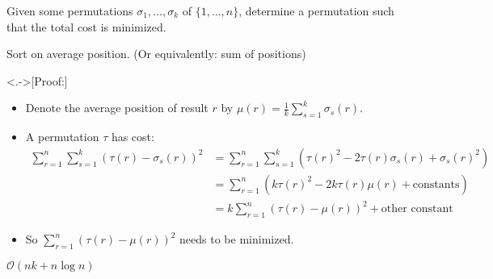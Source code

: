 \begin{frame}
    \frametitle{\problemtitle}
    \begin{description}
        \item<+->[Problem:] Given some permutations $\sigma_1, \ldots, \sigma_k$ of $\{1, \ldots, n\}$, determine a permutation such that the total cost is minimized.
        \item<+->[Solution:] Sort on average position. (Or equivalently: sum of positions)
        \item<.->[Proof:]
            \begin{itemize}
            \item<+-> Denote the average position of result $r$ by $\mu(r) = \frac{1}{k} \sum_{s=1}^k \sigma_s(r)$.
            \item<+-> A permutation $\tau$ has cost:
                \begin{align*}
                \sum_{r=1}^n \sum_{s=1}^k (\tau(r) - \sigma_s(r))^2 &= \sum_{r=1}^n \sum_{s=1}^k (\tau(r)^2 - 2\tau(r)\sigma_s(r) + \sigma_s(r)^2)\\
                &= \sum_{r=1}^n (k\tau(r)^2 - 2k\tau(r)\mu(r) + \text{constants})\\
                &= k\sum_{r=1}^n (\tau(r) - \mu(r))^2 + \text{other constant}
                \end{align*}
            \item<+-> So $\sum_{r=1}^n (\tau(r) - \mu(r))^2$ needs to be minimized.
            \end{itemize}
        \item<+->[Run time:] $\mathcal{O}(nk + n\log n)$
    \end{description}
    \solvestats
\end{frame}
